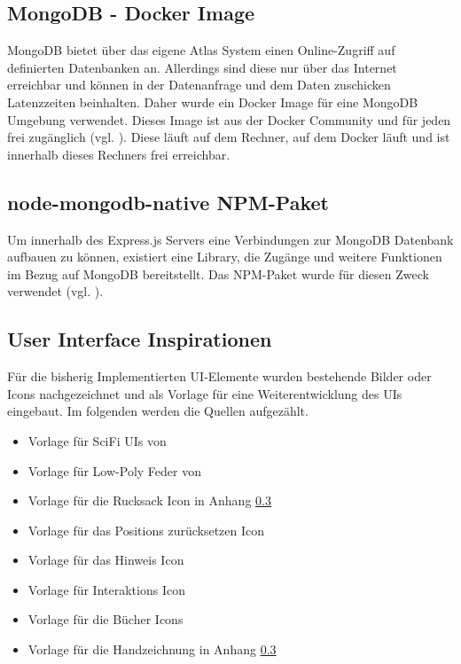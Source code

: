 \subsection{MongoDB - Docker Image}
MongoDB bietet über das eigene Atlas System einen Online-Zugriff auf definierten Datenbanken an. Allerdings sind diese nur über das Internet erreichbar und können in der Datenanfrage und dem Daten zuschicken Latenzzeiten beinhalten. Daher wurde ein Docker Image für eine MongoDB Umgebung verwendet. Dieses Image ist aus der Docker Community und für jeden frei zugänglich (vgl. \cite{noauthor_mongo_nodate}). Diese läuft auf dem Rechner, auf dem Docker läuft und ist innerhalb dieses Rechners frei erreichbar.

\subsection{node-mongodb-native NPM-Paket}
Um innerhalb des Express.js Servers eine Verbindungen zur MongoDB Datenbank aufbauen zu können, existiert eine Library, die Zugänge und weitere Funktionen im Bezug auf MongoDB bereitstellt. Das \ac{NPM}-Paket  wurde für diesen Zweck verwendet (vgl. \cite{mongodb_mongodbnode-mongodb-native_2025}).


\subsection{User Interface Inspirationen}
Für die bisherig Implementierten \ac{UI}-Elemente wurden bestehende Bilder oder Icons nachgezeichnet und als Vorlage für eine Weiterentwicklung des \ac{UI}s eingebaut. Im folgenden werden die Quellen aufgezählt.

\begin{itemize}
    \item Vorlage für SciFi \ac{UI}s von \cite{pchvector_free_nodate}
    \item Vorlage für Low-Poly Feder von \cite{masud_download_nodate}
    \item Vorlage für die Rucksack Icon in Anhang \ref{}
    \item Vorlage für das Positions zurücksetzen Icon \cite{noauthor_chatgpt_nodate-3}
    \item Vorlage für das Hinweis Icon \cite{noauthor_chatgpt_nodate-2}
    \item Vorlage für Interaktions Icon \cite{noauthor_chatgpt_nodate-1}
    \item Vorlage für die Bücher Icons \cite{noauthor_chatgpt_nodate}
    \item Vorlage für die Handzeichnung in Anhang \ref{}
\end{itemize}

